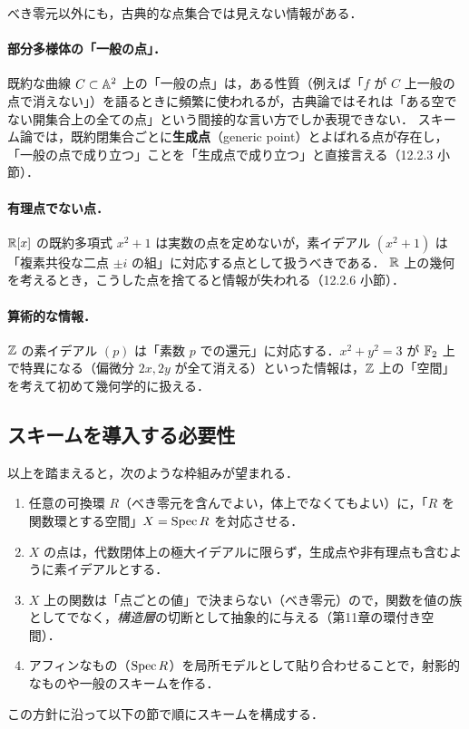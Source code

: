 べき零元以外にも，古典的な点集合では見えない情報がある．

\paragraph{部分多様体の「一般の点」．}
既約な曲線 $C\subset\mathbb{A}^2$ 上の「一般の点」は，ある性質（例えば「$f$ が $C$ 上一般の点で消えない」）を語るときに頻繁に使われるが，古典論ではそれは「ある空でない開集合上の全ての点」という間接的な言い方でしか表現できない．
スキーム論では，既約閉集合ごとに\textbf{生成点}（generic point）とよばれる点が存在し，「一般の点で成り立つ」ことを「生成点で成り立つ」と直接言える（12.2.3 小節）．

\paragraph{有理点でない点．}
$\mathbb{R}[x]$ の既約多項式 $x^2+1$ は実数の点を定めないが，素イデアル $(x^2+1)$ は「複素共役な二点 $\pm i$ の組」に対応する点として扱うべきである．
$\mathbb{R}$ 上の幾何を考えるとき，こうした点を捨てると情報が失われる（12.2.6 小節）．

\paragraph{算術的な情報．}
$\mathbb{Z}$ の素イデアル $(p)$ は「素数 $p$ での還元」に対応する．$x^2+y^2=3$ が $\mathbb{F}_2$ 上で特異になる（偏微分 $2x,2y$ が全て消える）といった情報は，$\mathbb{Z}$ 上の「空間」を考えて初めて幾何学的に扱える．

\subsection{スキームを導入する必要性}

以上を踏まえると，次のような枠組みが望まれる．
\begin{enumerate}
  \item 任意の可換環 $R$（べき零元を含んでよい，体上でなくてもよい）に，「$R$ を関数環とする空間」$X=\operatorname{Spec} R$ を対応させる．
  \item $X$ の点は，代数閉体上の極大イデアルに限らず，生成点や非有理点も含むように素イデアルとする．
  \item $X$ 上の関数は「点ごとの値」で決まらない（べき零元）ので，関数を値の族としてでなく，\emph{構造層}の切断として抽象的に与える（第11章の環付き空間）．
  \item アフィンなもの（$\operatorname{Spec} R$）を局所モデルとして貼り合わせることで，射影的なものや一般のスキームを作る．
\end{enumerate}
この方針に沿って以下の節で順にスキームを構成する．

